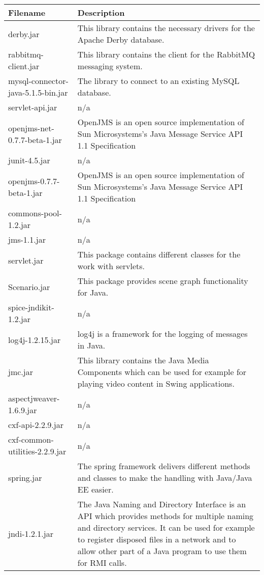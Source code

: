 \begin{center}
\begin{longtable}{|p{}|p{}|}
\hline 
Filename & Description\\
\hline
\hline 
derby.jar & This library contains the necessary drivers for the Apache Derby database.\\
\hline 
rabbitmq-client.jar & This library contains the client for the RabbitMQ messaging system.\\
\hline 
mysql-connector-java-5.1.5-bin.jar & The library to connect to an existing MySQL database.\\
\hline 
servlet-api.jar & n/a\\
\hline 
openjms-net-0.7.7-beta-1.jar & OpenJMS is an open source implementation of Sun Microsystems's Java Message Service API 1.1 Specification\\
\hline 
junit-4.5.jar & n/a\\
\hline 
openjms-0.7.7-beta-1.jar & OpenJMS is an open source implementation of Sun Microsystems's Java Message Service API 1.1 Specification\\
\hline 
commons-pool-1.2.jar & n/a\\
\hline 
jms-1.1.jar & n/a\\
\hline 
servlet.jar & This package contains different classes for the work with servlets.\\
\hline 
Scenario.jar & This package provides scene graph functionality for Java.\\
\hline 
spice-jndikit-1.2.jar & n/a\\
\hline 
log4j-1.2.15.jar & log4j is a framework for the logging of messages in Java.\\
\hline 
jmc.jar & This library contains the Java Media Components which can be used for example for playing video content in Swing applications.\\
\hline 
aspectjweaver-1.6.9.jar & n/a\\
\hline 
cxf-api-2.2.9.jar & n/a\\
\hline 
cxf-common-utilities-2.2.9.jar & n/a\\
\hline 
spring.jar & The spring framework delivers different methods and classes to make the handling with Java/Java EE easier.\\
\hline 
jndi-1.2.1.jar & The Java Naming and Directory Interface is an API which provides methods for multiple naming and directory services. It can be used for example to register disposed files in a network and to allow other part of a Java program to use them for RMI calls.\\

\end{longtable}
\end{center}
